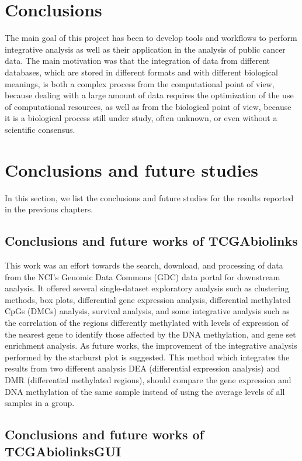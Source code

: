 \section{Conclusions}


The main goal of this project has been to develop tools and workflows to perform integrative analysis as well as their application in the analysis of public cancer data. The main motivation was that the integration of data from different databases, which are stored in different formats and with different biological meanings, is both a complex process from the computational point of view, because dealing with a large amount of data requires the optimization of the use of computational resources, as well as from the biological point of view, because it is a biological process still under study, often unknown, or even without a scientific consensus.

\section{Conclusions and future studies}

In this section, we list the conclusions and future studies for the results reported in the previous chapters.

\subsection{Conclusions and future works of TCGAbiolinks}

This work was an effort towards the search, download, and
processing of data from the NCI's Genomic Data Commons (GDC) data portal for
downstream analysis. It offered several single-dataset
exploratory analysis such as clustering methods, box plots,
 differential gene expression analysis, differential methylated CpGs (DMCs) analysis,
 survival analysis, and some integrative analysis
  such as the correlation of the regions differently methylated with levels of expression of the nearest gene to identify those affected by the DNA methylation, and gene set enrichment analysis.
As future works, the improvement of the integrative analysis performed by the starburst plot is suggested. This method which integrates the results from two different analysis DEA (differential expression analysis) and DMR (differential methylated regions), should compare the gene expression and DNA methylation of the same sample instead of using the average levels of all samples in a group.

\subsection{Conclusions and future works of TCGAbiolinksGUI}

